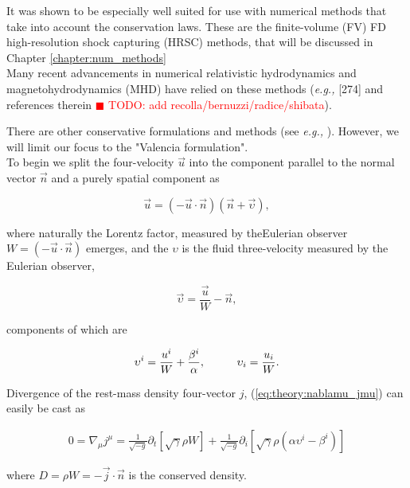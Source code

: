\documentclass[11pt,a4paper,headinclude=true,DIV=14,BCOR=8mm,chapterprefix,listof=totoc,twoside,openright,abstracton]{scrbook}
\newcommand{\todo}[1]{\textcolor{red}{$\blacksquare$ TODO: #1}}
\begin{document}
It was shown to be especially well suited for use with numerical methods that take into account the conservation laws. These are the finite-volume (FV) FD high-resolution shock capturing (HRSC) methods, that will be discussed in Chapter \ref{chapter:num_methods} \\

Many recent advancements in numerical relativistic hydrodynamics and magnetohydrodynamics (MHD) have relied on these methods (\textit{e.g.,} \cite{Giacomazzo:2010bx} [274]\cite{Rezzolla:2011da} and references therein \todo{add recolla/bernuzzi/radice/shibata}).

There are other conservative formulations and methods (see \textit{e.g.,} \cite{Papadopoulos:1999kt}). However, we will limit our focus to the "Valencia formulation". \\

To begin we split the four-velocity $\vec{u}$ into the component parallel to the normal vector $\vec{n}$ and a purely spatial component as

\begin{equation}
    \vec{u} = (-\vec{u} \cdot \vec{n})(\vec{n} + \vec{\upsilon}),
\end{equation}

where naturally the Lorentz factor, measured by theEulerian observer $W = (-\vec{u}\cdot\vec{n})$ emerges, and the $\upsilon$ is the fluid three-velocity measured by the Eulerian observer, 

\begin{equation}
    \vec{\upsilon} = \frac{\vec{u}}{W} -\vec{n},
\end{equation}

components of which are

\begin{equation}
    \upsilon^i = \frac{u^i}{W}+ \frac{\beta^i}{\alpha}, \hspace{10mm} \upsilon_i= \frac{u_{i}}{W}.
\end{equation}

Divergence of the rest-mass density four-vector $j$, (\ref{eq:theory:nablamu_jmu}) can easily be cast as 

\begin{eqnarray}
    0 = \nabla_{\mu}j^{\mu} = \frac{1}{\sqrt{-g}}\partial_{t}[\sqrt{\gamma}\rho W] + \frac{1}{\sqrt{-g}}\partial_{i}[\sqrt{\gamma}\rho(\alpha \upsilon^{i} - \beta^{i})]
\end{eqnarray}

where $D=\rho W = -\vec{j}\cdot \vec{n}$ is the conserved density.
\end{document}
